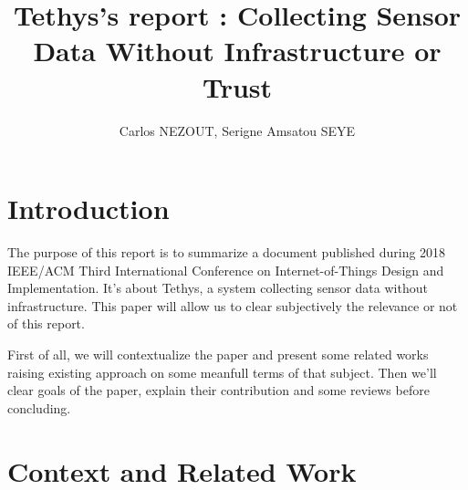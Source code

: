 \documentclass[10pt,journal,compsoc]{IEEEtran}
\begin{document}
%
\title{Tethys's report : Collecting Sensor Data Without Infrastructure or Trust}

\author{Carlos NEZOUT,
        Serigne Amsatou SEYE}%



\maketitle


\IEEEdisplaynontitleabstractindextext
\IEEEpeerreviewmaketitle


\section{Introduction}\label{sec:introduction}
The purpose of this report is to summarize a document published during 2018 IEEE/ACM Third International Conference on Internet-of-Things Design and Implementation. It's about Tethys, a system collecting sensor data without infrastructure. This paper will allow us to clear subjectively the relevance or not of this report.

First of all, we will contextualize the paper and present some related works raising existing approach on some meanfull terms of that subject. Then we'll clear goals of the paper, explain their contribution and some reviews before concluding.
\section{Context and Related Work}\label{sec:context}
\end{document}
